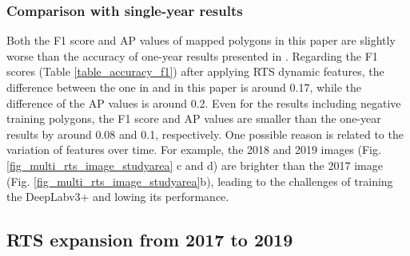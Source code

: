 \documentclass[authoryear,preprint,review,12pt]{elsarticle}
\begin{document}

\subsubsection{Comparison with single-year results}
\label{sec_compare_with_201805_results}

Both the F1 score and AP values of mapped polygons in this paper are slightly worse than the accuracy of one-year results presented in \cite{huang2020using}. 
Regarding the F1 scores (Table \ref{table_accuracy_f1}) after applying RTS dynamic features, the difference between the one in \cite{huang2020using} and in this paper is around 0.17, while the difference of the AP values is around 0.2.
Even for the results including negative training polygons, the F1 score and AP values are smaller than the one-year results by around 0.08 and 0.1, respectively. 
One possible reason is related to the variation of features over time. 
For example, the 2018 and 2019 images (Fig. \ref{fig_multi_rts_image_studyarea} c and d) are brighter than the 2017 image (Fig. \ref{fig_multi_rts_image_studyarea}b), leading to the challenges of training the DeepLabv3+ and lowing its performance. %



\subsection{RTS expansion from 2017 to 2019}
\label{sec_rts_expanding}
\end{document}
